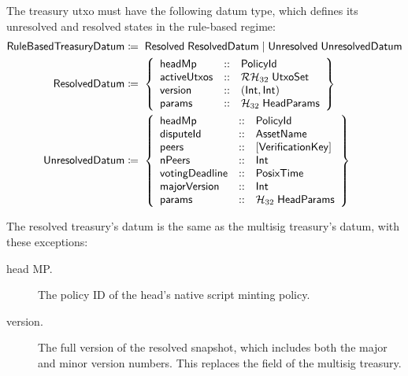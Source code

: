 \documentclass[../hydrozoa.tex]{subfiles}
\begin{document}
The treasury utxo must have the following datum type, which defines its unresolved and resolved states in the rule-based regime:
\begin{equation*}
\begin{split}
  \mathsf{RuleBasedTreasuryDatum} &\coloneq\;
    \mathsf{Resolved} \; \mathsf{ResolvedDatum} \mid
    \mathsf{Unresolved} \; \mathsf{UnresolvedDatum} \\
  \mathsf{ResolvedDatum} &\coloneq\;\left\{
    \begin{array}{lll}
      \mathsf{headMp} &::& \mathsf{PolicyId} \\
      \mathsf{activeUtxos}  &::& \mathcal{RH}_{32} \; \mathsf{UtxoSet} \\
      \mathsf{version} &::& (\mathsf{Int}, \mathsf{Int}) \\
      \mathsf{params} &::& \mathcal{H}_{32} \; \mathsf{HeadParams}
    \end{array}\right\} \\
  \mathsf{UnresolvedDatum} &\coloneq\;\left\{
    \begin{array}{lll}
      \mathsf{headMp} &::& \mathsf{PolicyId} \\
      \mathsf{disputeId} &::& \mathsf{AssetName} \\
      \mathsf{peers} &::& \mathsf{[VerificationKey]} \\
      \mathsf{nPeers} &::& \mathsf{Int} \\
      \mathsf{votingDeadline} &::& \mathsf{PosixTime} \\
      \mathsf{majorVersion} &::& \mathsf{Int} \\
      \mathsf{params} &::& \mathcal{H}_{32} \; \mathsf{HeadParams}
    \end{array}\right\}
\end{split}
\end{equation*}

The resolved treasury's datum is the same as the multisig treasury's datum, with these exceptions:
\begin{description}
  \item[head MP.] The policy ID of the head's native script minting policy.
  \item[version.] The full version of the resolved snapshot, which includes both the major and minor version numbers. This replaces the  field of the multisig treasury.
\end{description}
\end{document}
